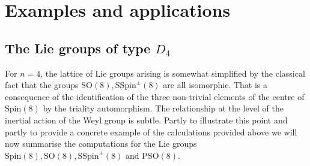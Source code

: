\documentclass[11pt,a4paper]{article}
\def\SSpin{\mathrm{SSpin}}
\def\Spin{\mathrm{Spin}}
\def\SO{\mathrm{SO}}
\def\PSO{\mathrm{PSO}}
\def\SSpin{\mathrm{SSpin}}
\begin{document}
\FloatBarrier
\section{Examples and applications}
\subsection{The Lie groups of type $D_4$}\label{D4 Lie groups}
For $n=4$, the lattice of Lie groups arising is somewhat simplified by the classical fact that the groups $\SO(8),\SSpin^\pm(8)$ are all isomorphic. That is a consequence of the identification of the three non-trivial elements of the centre of $\Spin(8)$ by the triality automorphism. The relationship at the level of the inertial action of the Weyl group is subtle. Partly to illustrate this point and partly to provide a concrete example of the calculations provided above we will now summarise the computations for the Lie groups $\Spin(8),\SO(8),\SSpin^\pm(8)$ and $\PSO(8)$.
\end{document}
